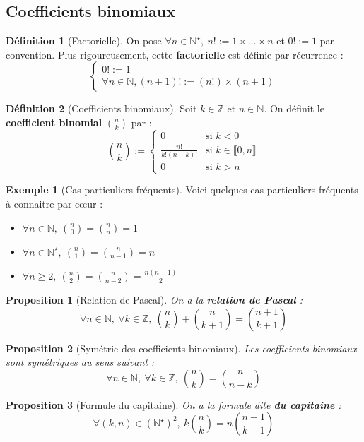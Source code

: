 \documentclass[french]{book}
\newcommand{\N}{\mathbb{N}}
\newcommand{\Z}{\mathbb{Z}}
\newcommand{\st}{^\star}
\theoremstyle{plain}
\newtheorem{prop}{Proposition}[chapter]
\theoremstyle{definition}
\newtheorem{dfn}{Définition}[chapter]
\newtheorem{exa}{Exemple}[chapter]
\theoremstyle{remark}
\begin{document}
\subsection{Coefficients binomiaux}
\begin{dfn}[Factorielle]
	On pose $\forall n\in\N\st,\ n!:=1\times\ldots\times n$ et $0!:=1$ par convention. Plus rigoureusement, cette \textbf{factorielle} est définie par récurrence : $$\begin{cases}
		0!:=1 \\ \forall n\in\N, (n+1)!:=(n!)\times(n+1)
	\end{cases}$$
\end{dfn}
\begin{dfn}[Coefficients binomiaux]
	Soit $k\in\Z$ et $n\in\N$. On définit le \textbf{coefficient binomial} $\displaystyle\binom{n}{k}$ par : $$\binom{n}{k}:=\begin{cases}
		0&\text{si }k<0 \\
		\displaystyle\frac{n!}{k!(n-k)!}&\text{si }k\in\llbracket0,n\rrbracket \\
		0&\text{si }k>n
	\end{cases}$$
\end{dfn}
\begin{exa}[Cas particuliers fréquents]
	Voici quelques cas particuliers fréquents à connaitre par cœur :
	\begin{itemize}
		\item $\displaystyle\forall n\in\N,\ \binom{n}{0}=\binom{n}{n}=1$
		\item $\displaystyle\forall n\in\N\st,\ \binom{n}{1}=\binom{n}{n-1}=n$
		\item $\displaystyle\forall n\geqslant2,\ \binom{n}{2}=\binom{n}{n-2}=\frac{n(n-1)}{2}$
	\end{itemize}
\end{exa}
\begin{prop}[Relation de Pascal]
	On a la \textbf{relation de Pascal} :
	$$\forall n\in\N,\ \forall k\in\Z,\ \binom{n}{k}+\binom{n}{k+1}=\binom{n+1}{k+1}$$
\end{prop}
\begin{prop}[Symétrie des coefficients binomiaux]
	Les coefficients binomiaux sont symétriques au sens suivant : $$\forall n\in\N,\ \forall k\in\Z,\ \binom{n}{k}=\binom{n}{n-k}$$
\end{prop}
\begin{prop}[Formule du capitaine]
	On a la formule dite \textbf{du capitaine} :
	$$\forall(k,n)\in(\N\st)^2,\ k\binom{n}{k}=n\binom{n-1}{k-1}$$
\end{prop}
\end{document}
